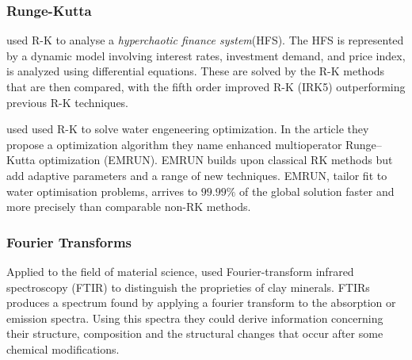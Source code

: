 \documentclass[fleqn,usenatbib]{mnras}
\begin{document}
\subsubsection{Runge-Kutta}

\cite{rangkuti2020accuracy} used R-K to analyse a \textit{hyperchaotic finance system}(HFS). The HFS is represented by a dynamic model involving interest rates, investment demand, and price index, is analyzed using differential equations. These are solved by the R-K methods that are then compared, with the fifth order improved R-K (IRK5) outperforming previous R-K techniques.

\cite{ahmadianfar2023enhanced} used used R-K to solve water engeneering optimization. In the article they propose a optimization algorithm they name enhanced multioperator Runge–Kutta optimization (EMRUN). EMRUN builds upon classical RK methods but add adaptive parameters and a range of new techniques. EMRUN, tailor fit to water optimisation problems, arrives to  $99.99\%$ of the global solution faster and more precisely than comparable non-RK methods.

\subsubsection{Fourier Transforms}

Applied to the field of material science, \cite{madejova2003ftir} used Fourier-transform infrared spectroscopy (FTIR) to distinguish the proprieties of clay minerals. FTIRs produces a spectrum found by applying a fourier transform to the absorption or emission spectra. Using this spectra they could derive information concerning their structure, composition and the structural changes that occur after some chemical modifications.






\bsp	%
\label{lastpage}
\end{document}
